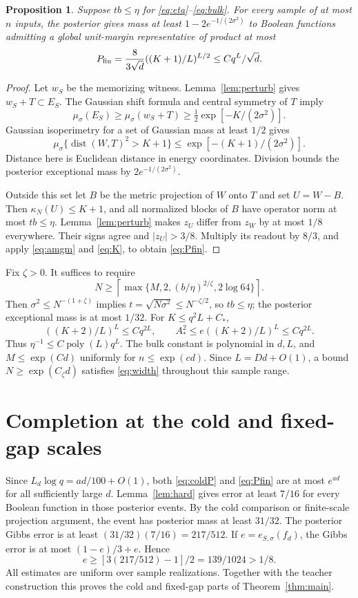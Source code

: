 \documentclass[11pt]{article}
\newtheorem{proposition}[theorem]{Proposition}
\theoremstyle{remark}\newtheorem{remark}[theorem]{Remark}
\newcommand{\poly}{\operatorname{poly}}
\newcommand{\dist}{\operatorname{dist}}
\begin{document}
\begin{proposition}\label{prop:finite}
Suppose $tb\le\eta$ for \eqref{eq:eta}--\eqref{eq:bulk}.
For every sample of at most $n$ inputs, the posterior gives mass
at least $1-2e^{-1/(2\sigma^2)}$ to Boolean functions admitting a
global unit-margin representative of product at most
\begin{equation}\label{eq:Pfin}
 P_{\rm fin}=\frac8{3\sqrt d}((K+1)/L)^{L/2}\le Cq^L/\sqrt d.
\end{equation}
\end{proposition}
\begin{proof}
Let $w_S$ be the memorizing witness.
Lemma~\ref{lem:perturb} gives $w_S+T\subset E_S$.
The Gaussian shift formula and central symmetry of $T$ imply
\[
 \mu_\sigma(E_S)\ge\mu_\sigma(w_S+T)
       \ge\tfrac12\exp[-K/(2\sigma^2)].
\]
Gaussian isoperimetry for a set of Gaussian mass at least $1/2$
gives
\[
 \mu_\sigma\{\dist(W,T)^2>K+1\}
        \le\exp[-(K+1)/(2\sigma^2)].
\]
Distance here is Euclidean distance in energy coordinates.
Division bounds the posterior exceptional mass by
$2e^{-1/(2\sigma^2)}$.

Outside this set let $B$ be the metric projection of $W$ onto
$T$ and set $U=W-B$. Then $\kappa_N(U)\le K+1$, and all
normalized blocks of $B$ have operator norm at most $tb\le\eta$.
Lemma~\ref{lem:perturb} makes $z_U$ differ from $z_W$ by at most
$1/8$ everywhere. Their signs agree and $|z_U|>3/8$.
Multiply its readout by $8/3$, and apply \eqref{eq:amgm} and
\eqref{eq:K}, to obtain \eqref{eq:Pfin}.
\end{proof}


Fix $\zeta>0$. It suffices to require
\begin{equation}\label{eq:width}
 N\ge\left\lceil\max\{M,2,(b/\eta)^{2/\zeta},2\log64\}\right\rceil.
\end{equation}
Then $\sigma^2\le N^{-(1+\zeta)}$ implies
$t=\sqrt{N\sigma^2}\le N^{-\zeta/2}$, so $tb\le\eta$;
the posterior exceptional mass is at most $1/32$.
For $K\le q^2L+C_*$,
\[
 ((K+2)/L)^L\le Cq^{2L},\qquad
 A_*^2\le e((K+2)/L)^L\le Cq^{2L}.
\]
Thus $\eta^{-1}\le C\poly(L)q^L$.
The bulk constant is polynomial in $d,L$, and
$M\le\exp(Cd)$ uniformly for $n\le\exp(cd)$.
Since $L=Dd+O(1)$, a bound $N\ge\exp(C_\zeta d)$
satisfies \eqref{eq:width} throughout this sample range.

\section{Completion at the cold and fixed-gap scales}
Since $L_d\log q=ad/100+O(1)$, both
\eqref{eq:coldP} and \eqref{eq:Pfin} are at most $e^{ad}$
for all sufficiently large $d$.
Lemma~\ref{lem:hard} gives error at least $7/16$ for every
Boolean function in those posterior events.
By the cold comparison or finite-scale projection argument,
the event has posterior mass at least $31/32$.
The posterior Gibbs error is at least
$(31/32)(7/16)=217/512$.
If $e=e_{S,\sigma}(f_d)$, the Gibbs error is at most
$(1-e)/3+e$. Hence
\[
 e\ge[3(217/512)-1]/2=139/1024>1/8.
\]
All estimates are uniform over sample realizations. Together
with the teacher construction this proves the cold and fixed-gap
parts of Theorem~\ref{thm:main}.
\end{document}
